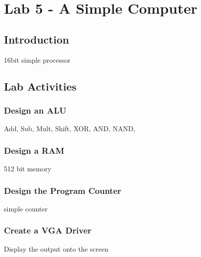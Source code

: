 \section{Lab 5 - A Simple Computer}

\subsection{Introduction}
16bit simple processor

\subsection{Lab Activities}

\subsubsection{Design an ALU}
Add, Sub, Mult, Shift, XOR, AND, NAND,

\subsubsection{Design a RAM}
512 bit memory

\subsubsection{Design the Program Counter}
simple counter

\subsubsection{Create a VGA Driver}
Display the output onto the screen